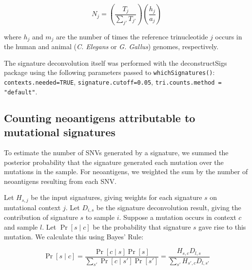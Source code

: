 \[
N_j = \left ( \frac{T_j}{\sum_{j'}{T_{j'}}} \right ) \left ( \frac{h_j}{a_j} \right )
\]

where $h_j$ and $m_j$ are the number of times the reference trinucleotide $j$ occurs in the human and animal (\textit{C. Elegans} or \textit{G. Gallus}) genomes, respectively.

The signature deconvolution itself was performed with the deconstructSigs\cite{Rosenthal_2016} package using the following parameters passed to \texttt{whichSignatures()}: \texttt{contexts.needed=TRUE}, \texttt{signature.cutoff=0.05}, \texttt{tri.counts.method = "default"}.

\subsection*{Counting neoantigens attributable to mutational signatures}
To estimate the number of SNVs generated by a signature, we summed the posterior probability that the signature generated each mutation over the mutations in the sample. For neoantigens, we weighted the sum by the number of neoantigens resulting from each SNV.

Let $H_{s,j}$ be the input signatures, giving weights for each signature $s$ on mutational context $j$. Let $D_{i,s}$ be the signature deconvolution result, giving the contribution of signature $s$ to sample $i$. Suppose a mutation occurs in context $c$ and sample $l$. Let $\Pr[s \mid c]$ be the probability that signature $s$ gave rise to this mutation. We calculate this using Bayes' Rule:

\[
\Pr[s \mid c] = \frac{\Pr[c \mid s] \Pr[s]}{\sum_{s'}{\Pr[c \mid s']\Pr[s']}} = \frac{H_{s,c} D_{l,s}}{\sum_{s'}{H_{s',c} D_{l,s'}}}
\]
